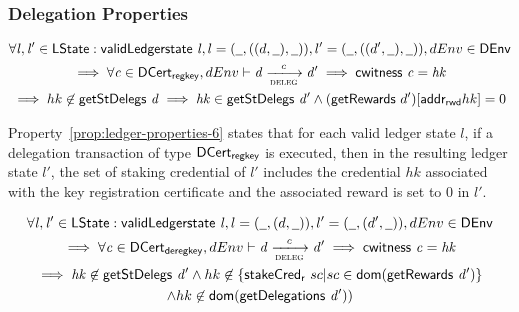 
\subsubsection{Delegation Properties}
\label{sec:ledg-prop-deleg}

\begin{property}
  \begin{multline*}
    \forall \var{l}, \var{l'} \in \ledgerState: \applyFun{validLedgerstate}{l},
    l = (\wcard, ((d, \wcard), \wcard)), l' = (\wcard, ((d',\wcard), \wcard)), dEnv\in\DEnv \\
    \implies \forall \var{c} \in \DCertRegKey, dEnv\vdash \var{d}
    \trans{deleg}{c} \var{d'} \implies \applyFun{cwitness}{c} = \var{hk}\\
    \implies hk\not\in \fun{getStDelegs}~\var{d} \implies \var{hk} \in
    \applyFun{getStDelegs}{d'} \wedge
    (\applyFun{getRewards}\var{d'})[\fun{addr_{rwd}}{hk}] = 0
  \end{multline*}
  \label{prop:ledger-properties-6}
\end{property}

Property~\ref{prop:ledger-properties-6} states that for each valid ledger state
$l$, if a delegation transaction of type $\mathsf{DCert_{regkey}}$ is executed, then in the
resulting ledger state $l'$, the set of staking credential of $l'$ includes the
credential $hk$ associated with the key registration certificate and the
associated reward is set to 0 in $l'$.

\begin{property}
  \begin{multline*}
    \forall \var{l}, \var{l'} \in \ledgerState: \applyFun{validLedgerstate}{l},
    l = (\wcard, (d, \wcard)), l' = (\wcard, (d', \wcard)), dEnv\in\DEnv \\
    \implies \forall \var{c} \in \DCertDeRegKey, dEnv\vdash\var{d}
    \trans{deleg}{c} \var{d'} \implies \applyFun{cwitness}{c} = \var{hk}\\
    \implies \var{hk} \not\in \applyFun{getStDelegs}{d'} \wedge hk\not\in
    \left\{ \fun{stakeCred_{r}}~sc\vert
      sc\in\fun{dom}(\applyFun{getRewards}{d'})
    \right\}\\
    \wedge hk \not\in \fun{dom}(\applyFun{getDelegations}{d'}))
  \end{multline*}
  \label{prop:ledger-properties-7}
\end{property}

